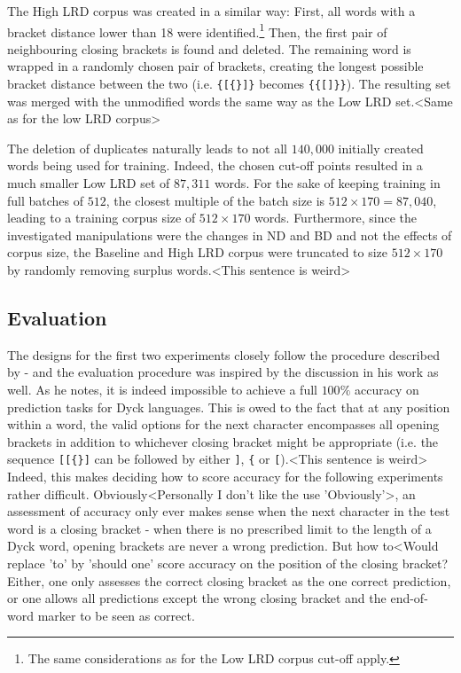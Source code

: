 The High LRD corpus was created in a similar way: First, all words with a bracket distance lower than 18 were identified.\footnote{The same considerations as for the Low LRD corpus cut-off apply.} Then, the first pair of neighbouring closing brackets is found and deleted. The remaining word is wrapped in a randomly chosen pair of brackets, creating the longest possible bracket distance between the two (i.e. \texttt{\{[\{\}]\}} becomes \texttt{\{\{[]\}\}}). The resulting set was merged with the unmodified words the same way as the Low LRD set.<Same as for the low LRD corpus>

The deletion of duplicates naturally leads to not all $140,000$ initially created words being used for training. Indeed, the chosen cut-off points resulted in a much smaller Low LRD set of $87,311$ words. For the sake of keeping training in full batches of $512$, the closest multiple of the batch size is $512 \times 170 = 87,040$, leading to a training corpus size of $512 \times 170$ words. Furthermore, since the investigated manipulations were the changes in ND and BD and not the effects of corpus size, the Baseline and High LRD corpus were truncated to size $512 \times 170$ by randomly removing surplus words.<This sentence is weird>

\subsection{Evaluation}\label{evaluation}
The designs for the first two experiments closely follow the procedure described by \cite{Bernardy2018} - and the evaluation procedure was inspired by the discussion in his work as well. As he notes, it is indeed impossible to achieve a full $100\%$ accuracy on prediction tasks for Dyck languages. This is owed to the fact that at any position within a word, the valid options for the next character encompasses all opening brackets in addition to whichever closing bracket might be appropriate (i.e. the sequence \texttt{[[\{\}]} can be followed by either \texttt{]}, \texttt{\{} or \texttt{[}).<This sentence is weird> Indeed, this makes deciding how to score accuracy for the following experiments rather difficult. Obviously<Personally I don't like the use 'Obviously'>, an assessment of accuracy only ever makes sense when the next character in the test word is a closing bracket - when there is no prescribed limit to the length of a Dyck word, opening brackets are never a wrong prediction. But how to<Would replace 'to' by 'should one' score accuracy on the position of the closing bracket? Either, one only assesses the correct closing bracket as the one correct prediction, or one allows all predictions except the wrong closing bracket and the end-of-word marker to be seen as correct.

